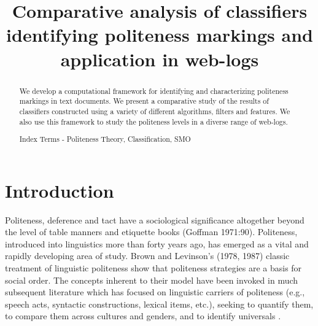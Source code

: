\documentclass[conference]{IEEEtran}
\begin{document}
%
\title{Comparative analysis of classifiers identifying politeness markings and application in web-logs}


\author{
\and
{}
}




\maketitle
\thispagestyle{plain}
\pagestyle{plain}


\begin{abstract}
We develop a computational framework for identifying and characterizing politeness markings in text documents. We present a comparative study of the results of classifiers constructed using a variety of different algorithms, filters and features. We also use this framework to study the politeness levels in a diverse range of web-logs.

Index Terms - Politeness Theory, Classification, SMO
\end{abstract}
\IEEEpeerreviewmaketitle


\section{Introduction}
Politeness, deference and tact have a sociological significance altogether beyond the level of table manners and etiquette books (Goffman 1971:90). Politeness, introduced into linguistics more than forty years ago, has emerged as a vital and rapidly developing area of study. Brown and Levinson's (1978, 1987) classic treatment of linguistic politeness show that politeness strategies are a basis for social order. The concepts inherent to their model have been invoked in much subsequent literature which has focused on linguistic carriers of politeness (e.g., speech acts, syntactic constructions, lexical items, etc.), seeking to quantify them, to compare them across cultures and genders, and to identify universals \cite{Meier}.
\end{document}
